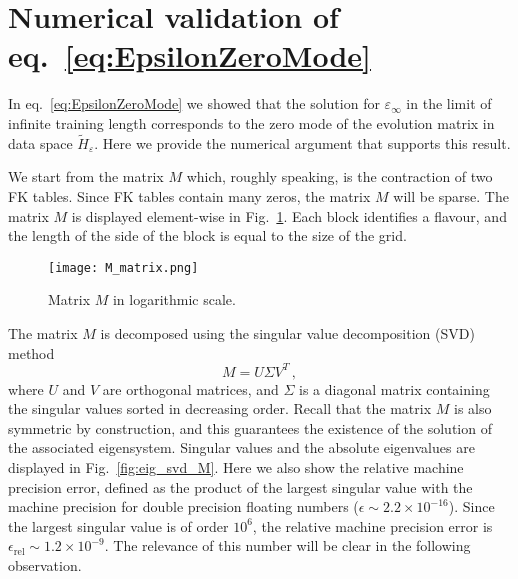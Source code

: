 \section{Numerical validation of eq.~\eqref{eq:EpsilonZeroMode}}
\label{app:zero_mode}
In eq.~\eqref{eq:EpsilonZeroMode} we showed that the solution for
$\varepsilon_{\infty}$ in the limit of infinite training length corresponds to
the zero mode of the evolution matrix in data space $\tilde{H}_{\varepsilon}$.
Here we provide the numerical argument that supports this result.

We start from the matrix $M$ which, roughly speaking, is the contraction of two
FK tables. Since FK tables contain many zeros, the matrix $M$ will be sparse.
The matrix $M$ is displayed element-wise in Fig.~\ref{fig:MatrixM}. Each block
identifies a flavour, and the length of the side of the block is equal to the
size of the grid. 
\begin{figure}[h]
  \centering
  \texttt{[image: M\_matrix.png]}
  \caption{\small Matrix $M$ in logarithmic scale.}
  \label{fig:MatrixM}
\end{figure}
The matrix $M$ is decomposed using the singular value decomposition (SVD) method
\begin{equation}
M = U \Sigma V^T \,,
\end{equation}
where $U$ and $V$ are orthogonal matrices, and $\Sigma$ is a diagonal matrix
containing the singular values sorted in decreasing order. Recall that the
matrix $M$ is also symmetric by construction, and this guarantees the existence
of the solution of the associated eigensystem. Singular values and the absolute
eigenvalues are displayed in Fig.~\ref{fig:eig_svd_M}. Here we also show the
relative machine precision error, defined as the product of the largest singular
value with the machine precision for double precision floating numbers
($\epsilon \sim 2.2 \times 10^{-16}$). Since the largest singular value is of
order $10^6$, the relative machine precision error is
$\epsilon_{\textrm{rel}}\sim1.2\times 10^{-9}$. The relevance of this number
will be clear in the following observation.

